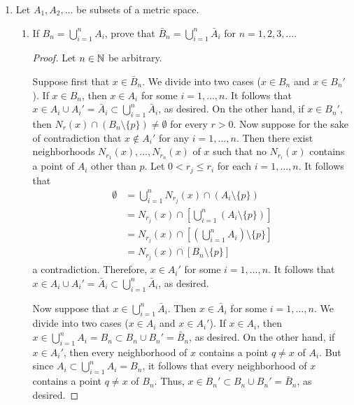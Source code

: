 \documentclass[../psets.tex]{subfiles}
\begin{document}
\begin{enumerate}[label={\textbf{\arabic*.}}]
\begin{proof}
\begin{align*}
            &= N_r(p)\cap[(E\setminus\{p\})\cup(E'\setminus\{p\})]\\
            &= [N_r(p)\cap(E\setminus\{p\})]\cup[N_r(p)\cap(E'\setminus\{p\})]\\
            &\supset N_r(p)\cap(E\setminus\{p\})\\
            & \neq\emptyset
        \end{align*}
        as desired.\par
        No, $E$ and $E'$ do not always have the same limit points. Let $E=\{1/n:n\in\N\}$. Then $E'=\{0\}$, but since $E'$ is finite, $E''=\emptyset$.
    \end{proof}
    \item Let $A_1,A_2,\dots$ be subsets of a metric space.
    \begin{enumerate}
        \item If $B_n=\bigcup_{i=1}^nA_i$, prove that $\bar{B}_n=\bigcup_{i=1}^n\bar{A}_i$ for $n=1,2,3,\dots$.
        \begin{proof}
            Let $n\in\mathbb{N}$ be arbitrary.\par
            Suppose first that $x\in\bar{B}_n$. We divide into two cases ($x\in B_n$ and $x\in B_n'$). If $x\in B_n$, then $x\in A_i$ for some $i=1,\dots,n$. It follows that $x\in A_i\cup A_i'=\bar{A}_i\subset\bigcup_{i=1}^n\bar{A}_i$, as desired. On the other hand, if $x\in B_n'$, then $N_r(x)\cap(B_n\setminus\{p\})\neq\emptyset$ for every $r>0$. Now suppose for the sake of contradiction that $x\notin A_i'$ for any $i=1,\dots,n$. Then there exist neighborhoods $N_{r_1}(x),\dots,N_{r_n}(x)$ of $x$ such that no $N_{r_i}(x)$ contains a point of $A_i$ other than $p$. Let $0<r_j\leq r_i$ for each $i=1,\dots,n$. It follows that
            \begin{align*}
                \emptyset &= \bigcup_{i=1}^nN_{r_j}(x)\cap(A_i\setminus\{p\})\\
                &= N_{r_j}(x)\cap\left[ \bigcup_{i=1}^n(A_i\setminus\{p\}) \right]\\
                &= N_{r_j}(x)\cap\left[ \left( \bigcup_{i=1}^nA_i \right)\setminus\{p\} \right]\\
                &= N_{r_j}(x)\cap\left[ B_n\setminus\{p\} \right]
            \end{align*}
            a contradiction. Therefore, $x\in A_i'$ for some $i=1,\dots,n$. It follows that $x\in A_i\cup A_i'=\bar{A}_i\subset\bigcup_{i=1}^n\bar{A}_i$, as desired.
            \par
            Now suppose that $x\in\bigcup_{i=1}^n\bar{A}_i$. Then $x\in\bar{A}_i$ for some $i=1,\dots,n$. We divide into two cases ($x\in A_i$ and $x\in A_i'$). If $x\in A_i$, then $x\in\bigcup_{i=1}^nA_i=B_n\subset B_n\cup B_n'=\bar{B}_n$, as desired. On the other hand, if $x\in A_i'$, then every neighborhood of $x$ contains a point $q\neq x$ of $A_i$. But since $A_i\subset\bigcup_{i=1}^nA_i=B_n$, it follows that every neighborhood of $x$ contains a point $q\neq x$ of $B_n$. Thus, $x\in B_n'\subset B_n\cup B_n'=\bar{B}_n$, as desired.

\end{proof}
\end{enumerate}
\end{enumerate}
\end{document}
